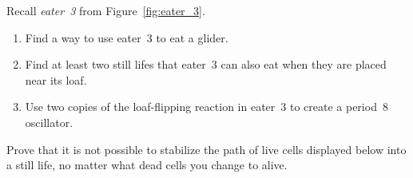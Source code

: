 \begin{multicols}{2}
	
	\mfilbreak
	
	
	\begin{problem}\label{exer:eater_3}
		Recall \emph{eater~3} from Figure~\ref{fig:eater_3}.\smallskip
		
		\begin{enumerate}[label=\bf\color{ocre}(\alph*)]
			\item Find a way to use eater~3 to eat a glider.
			
			\item Find at least two still lifes that eater~3 can also eat when they are placed near its loaf.
			
			\item Use two copies of the loaf-flipping reaction in eater~3 to create a period~$8$ oscillator.
		\end{enumerate}
	\end{problem}
	
	
	\mfilbreak
	
	
	\begin{problem}\label{exer:still_life_impossible}
		Prove that it is not possible to stabilize the path of live cells displayed below into a still life, no matter what dead cells you change to alive.
		
		\begin{center}
		\end{center}
	\end{problem}
	

\end{multicols}
